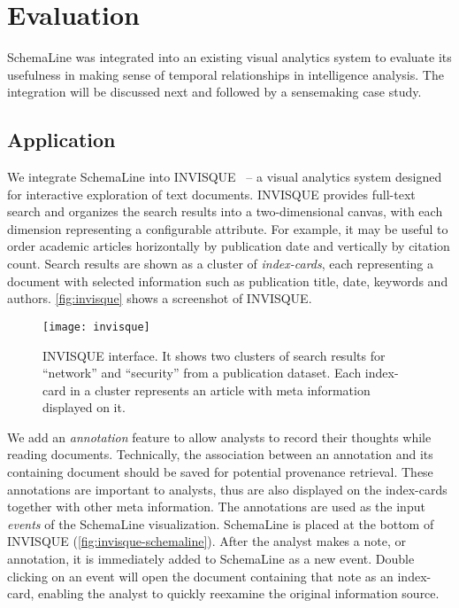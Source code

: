 \section{Evaluation}
\label{sub:sl-evaluation}
SchemaLine was integrated into an existing visual analytics system to evaluate its usefulness in making sense of temporal relationships in intelligence analysis. The integration will be discussed next and followed by a sensemaking case study.

\subsection{Application}
We integrate SchemaLine into INVISQUE~\cite{Wong2011} -- a visual analytics system designed for interactive exploration of text documents. INVISQUE provides full-text search and organizes the search results into a two-dimensional canvas, with each dimension representing a configurable attribute. For example, it may be useful to order academic articles horizontally by publication date and vertically by citation count. Search results are shown as a cluster of \emph{index-cards}, each representing a document with selected information such as publication title, date, keywords and authors. \autoref{fig:invisque} shows a screenshot of INVISQUE.

\begin{figure}
	\centering
	\texttt{[image: invisque]}
	\caption[INVISQUE interface]{INVISQUE interface. It shows two clusters of search results for ``network'' and ``security'' from a publication dataset. Each index-card in a cluster represents an article with meta information displayed on it. }
	\label{fig:invisque}
\end{figure}

We add an \emph{annotation} feature to allow analysts to record their thoughts while reading documents. Technically, the association between an annotation and its containing document should be saved for potential provenance retrieval. These annotations are important to analysts, thus are also displayed on the index-cards together with other meta information. The annotations are used  as the input \emph{events} of the SchemaLine visualization. SchemaLine is placed at the bottom of INVISQUE (\autoref{fig:invisque-schemaline}). After the analyst makes a note, or annotation, it is immediately added to SchemaLine as a new event. Double clicking on an event will open the document containing that note as an index-card, enabling the analyst to quickly reexamine the original information source.

